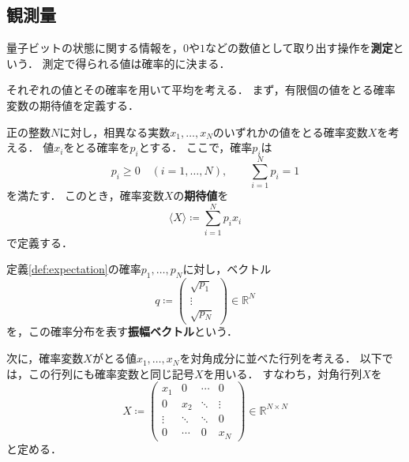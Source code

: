 \subsection{観測量}
\label{subsec:observables}

量子ビットの状態に関する情報を，$0$や$1$などの数値として取り出す操作を\textbf{測定}という．
測定で得られる値は確率的に決まる．

それぞれの値とその確率を用いて平均を考える．
まず，有限個の値をとる確率変数の期待値を定義する．

\begin{defi}[期待値]
\label{def:expectation}
正の整数$N$に対し，相異なる実数$x_1,\ldots,x_N$のいずれかの値をとる確率変数$X$を考える．
値$x_i$をとる確率を$p_i$とする．
ここで，確率$p_i$は
\begin{equation*}
  p_i\geq 0\quad(i=1,\ldots,N),
  \qquad
  \sum_{i=1}^{N}p_i=1
\end{equation*}
を満たす．
このとき，確率変数$X$の\textbf{期待値}を
\begin{equation}
  \langle X\rangle\coloneq\sum_{i=1}^{N}p_i x_i
  \label{eq:expectation-finite-distribution}
\end{equation}
で定義する．
\end{defi}



\begin{defi}[振幅ベクトル]
\label{def:classical-amplitude-vector}
定義\ref{def:expectation}の確率$p_1,\ldots,p_N$に対し，ベクトル
\begin{equation}
  q\coloneq
  \begin{pmatrix}
    \sqrt{p_1}\\
    \vdots\\
    \sqrt{p_N}
  \end{pmatrix}
  \in\mathbb R^N
  \label{eq:classical-amplitude-vector}
\end{equation}
を，この確率分布を表す\textbf{振幅ベクトル}という\cite[p.~93]{schuld2020}．
\end{defi}

次に，確率変数$X$がとる値$x_1,\ldots,x_N$を対角成分に並べた行列を考える．
以下では，この行列にも確率変数と同じ記号$X$を用いる．
すなわち，対角行列$X$を
\begin{equation}
  X\coloneq
  \begin{pmatrix}
    x_1 & 0 & \cdots & 0\\
    0 & x_2 & \ddots & \vdots\\
    \vdots & \ddots & \ddots & 0\\
    0 & \cdots & 0 & x_N
  \end{pmatrix}
  \in\mathbb R^{N\times N}
  \label{eq:classical-observable-diagonal-matrix}
\end{equation}
と定める\cite[p.~93]{schuld2020}．

